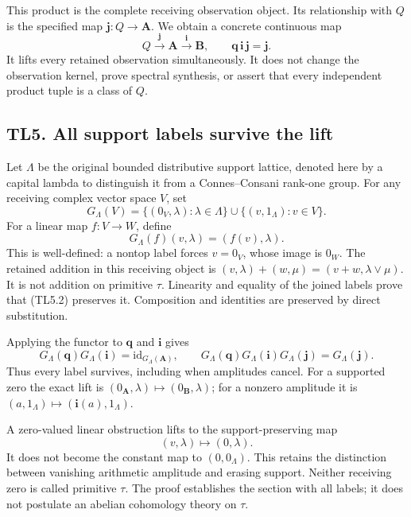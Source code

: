 This product is the complete receiving observation object. Its
relationship with \(Q\) is the specified map
\(\mathbf j:Q\to\mathbf A\). We obtain a concrete continuous map \[
Q\xrightarrow{\mathbf j}\mathbf A
\xrightarrow{\mathbf i}\mathbf B,\qquad
\mathbf q\,\mathbf i\,\mathbf j=\mathbf j.
\tag{TL4.3}
\] It lifts every retained observation simultaneously. It does not
change the observation kernel, prove spectral synthesis, or assert that
every independent product tuple is a class of \(Q\).

\subsection{TL5. All support labels survive the
lift}\label{tl5.-all-support-labels-survive-the-lift}

Let \(\Lambda\) be the original bounded distributive support lattice,
denoted here by a capital lambda to distinguish it from a
Connes--Consani rank-one group. For any receiving complex vector space
\(V\), set \[
G_\Lambda(V)=
\{(0_V,\lambda):\lambda\in\Lambda\}
\cup\{(v,1_\Lambda):v\in V\}.
\tag{TL5.1}
\] For a linear map \(f:V\to W\), define \[
G_\Lambda(f)(v,\lambda)=(f(v),\lambda).
\tag{TL5.2}
\] This is well-defined: a nontop label forces \(v=0_V\), whose image is
\(0_W\). The retained addition in this receiving object is
\((v,\lambda)+(w,\mu)=(v+w,\lambda\vee\mu)\). It is not addition on
primitive \(\tau\). Linearity and equality of the joined labels prove
that (TL5.2) preserves it. Composition and identities are preserved by
direct substitution.

Applying the functor to \(\mathbf q\) and \(\mathbf i\) gives \[
G_\Lambda(\mathbf q)G_\Lambda(\mathbf i)
=\mathrm{id}_{G_\Lambda(\mathbf A)},\qquad
G_\Lambda(\mathbf q)G_\Lambda(\mathbf i)G_\Lambda(\mathbf j)
=G_\Lambda(\mathbf j).
\tag{TL5.3}
\] Thus every label survives, including when amplitudes cancel. For a
supported zero the exact lift is
\((0_{\mathbf A},\lambda)\mapsto(0_{\mathbf B},\lambda)\); for a nonzero
amplitude it is \((a,1_\Lambda)\mapsto(\mathbf i(a),1_\Lambda)\).

A zero-valued linear obstruction lifts to the support-preserving map \[
(v,\lambda)\longmapsto(0,\lambda).
\tag{TL5.4}
\] It does not become the constant map to \((0,0_\Lambda)\). This
retains the distinction between vanishing arithmetic amplitude and
erasing support. Neither receiving zero is called primitive \(\tau\).
The proof establishes the section with all labels; it does not postulate
an abelian cohomology theory on \(\tau\).

